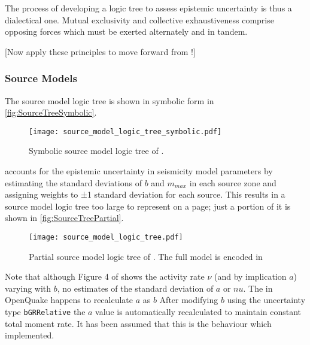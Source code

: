 \documentclass{article}
\begin{document}
The process of developing a logic tree to assess epistemic uncertainty is thus a dialectical one. Mutual exclusivity and collective exhaustiveness comprise opposing forces which must be exerted alternately and in tandem.

[Now apply these principles to move forward from \cite{nath2012probabilistic}!] 

\subsubsection{Source Models}
\label{subsubsec:SourceTree}

The source model logic tree is shown in symbolic form in \autoref{fig:SourceTreeSymbolic}.

\begin{figure}[!htb]
\begin{adjustbox}{center}
\texttt{[image: source\_model\_logic\_tree\_symbolic.pdf]}
\end{adjustbox}
\caption[Symbolic source model logic tree]{Symbolic source model logic tree of \cite{nath2012probabilistic}.}
\label{fig:SourceTreeSymbolic}
\end{figure}

\cite{nath2012probabilistic} accounts for the epistemic uncertainty in seismicity model parameters by estimating the standard deviations of $b$ and $m_{max}$ in each source zone and assigning weights to ±1 standard deviation for each source. This results in a source model logic tree too large to represent on a page; just a portion of it is shown in \autoref{fig:SourceTreePartial}. 

\begin{figure}
\begin{adjustbox}{center}
\texttt{[image: source\_model\_logic\_tree.pdf]}
\end{adjustbox}
\caption[Partial source model logic tree]{Partial source model logic tree of \cite{nath2012probabilistic}. The full model is encoded in \texttt{}}
\label{fig:SourceTreePartial}
\end{figure}

Note that although Figure 4 of \cite{nath2012probabilistic} shows the activity rate $\nu$ (and by implication $a$) varying with $b$, no estimates of the standard deviation of $a$ or $nu$. The  in OpenQuake happens to recalculate $a$ as $b$ After modifying $b$ using the uncertainty type \texttt{bGRRelative} the $a$ value is automatically recalculated to maintain constant total moment rate. It has been assumed that this is the behaviour which \cite{nath2012probabilistic} implemented.
\end{document}
